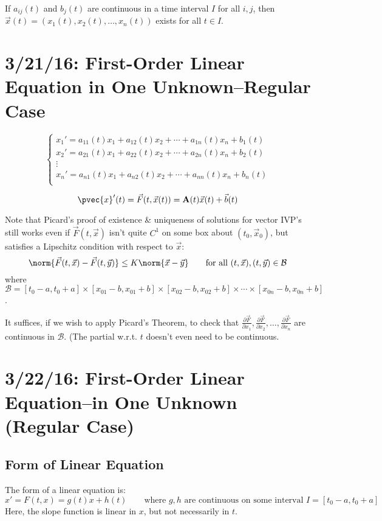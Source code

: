 \documentclass[12pt]{article}
\begin{document}
\begin{theorem}
If $a_{ij}(t)$ and $b_j(t)$ are continuous in a time interval $I$ for all $i,j$, then $\vec{x}(t) = (x_1(t),x_2(t),\dots,x_n(t))$ exists for all $t \in I$.
\end{theorem}

\section{3/21/16: First-Order Linear Equation in One Unknown--Regular Case}
\[ 
\begin{cases}
x_1' = a_{11}(t)x_1 + a_{12}(t)x_2 + \cdots + a_{1n}(t)x_n + b_1(t) \\
x_2' = a_{21}(t)x_1 + a_{22}(t)x_2 + \cdots + a_{2n}(t)x_n + b_2(t) \\
\vdots \\
x_n' = a_{n1}(t)x_1 + a_{n2}(t)x_2 + \cdots + a_{nn}(t)x_n + b_n(t) \\
\end{cases}
\]

\[ \pvec{x}'(t) = \vec{F}(t,\vec{x}(t)) = {\bf A}(t)\vec{x}(t) + \vec{b}(t) \]

Note that Picard's proof of existence \& uniqueness of solutions for vector IVP's still works even if $\vec{F}(t,\vec{x})$ isn't quite $C^1$ on some box about $(t_0, \vec{x}_0)$, but satisfies a Lipschitz condition with respect to $\vec{x}$:
\[ \norm{\vec{F}(t,\vec{x}) - \vec{F}(t,\vec{y})} \le K\norm{\vec{x} - \vec{y}} \qquad \text{for all } (t,\vec{x}), (t,\vec{y}) \in \mathcal{B} \]
where $\mathcal{B} = [t_0-a,t_0+a] \times [x_{01} - b,x_{01} + b] \times [x_{02} - b, x_{02} + b] \times \cdots \times [x_{0n} - b,x_{0n} + b]$.

It suffices, if we wish to apply Picard's Theorem, to check that $\frac{\partial \vec{F}}{\partial x_1},\frac{\partial \vec{F}}{\partial x_2},\dots,\frac{\partial \vec{F}}{\partial x_n}$ are continuous in $\mathcal{B}$. (The partial w.r.t. $t$ doesn't even need to be continuous.

\section{3/22/16: First-Order Linear Equation--in One Unknown (Regular Case)}

\subsection{Form of Linear Equation}
The form of a linear equation is:
\[ x' = F(t,x) = g(t)x + h(t) \qquad \text{where } g,h \text{ are continuous on some interval } I=[t_0 - a,t_0 + a] \]
Here, the slope function is linear in $x$, but not necessarily in $t$.
\end{document}
